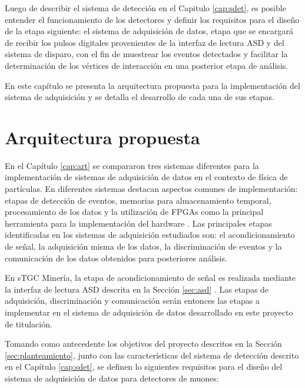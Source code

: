 Luego de describir el sistema de detección en el Capitulo \ref{cap:sdet}, es posible entender el funcionamiento de los detectores y definir los requisitos para el diseño de la etapa siguiente: el sistema de adquisición de datos, etapa que se encargará de recibir los pulsos digitales provenientes de la interfaz de lectura ASD y del sistema de disparo, con el fin de muestrear los eventos detectados y facilitar la determinación de los vértices de interacción en una posterior etapa de análisis.

En este capítulo se presenta la arquitectura propuesta para la implementación del sistema de adquisición y se detalla el desarrollo de cada una de sus etapas.

\section{Arquitectura propuesta}
\label{sec:arq}

	En el Capítulo \ref{cap:art} se compararon tres sistemas diferentes para la implementación de sistemas de adquisición de datos en el contexto de física de partículas. En diferentes sistemas destacan aspectos comunes de implementación: etapas de detección de eventos, memorias para almacenamiento temporal, procesamiento de los datos y la utilización de FPGAs como la principal herramienta para la implementación del hardware . Las principales etapas identificadas en los sistemas de adquisición estudiados son: el acondicionamiento de señal, la adquisición misma de los datos, la discriminación de eventos y la comunicación de los datos obtenidos para posteriores análisis.
	
	En sTGC Minería, la etapa de acondicionamiento de señal es realizada mediante la interfaz de lectura ASD descrita en la Sección \ref{sec:asd} . Las etapas de adquisición, discriminación y comunicación serán entonces las etapas a implementar en el sistema de adquisición de datos desarrollado en este proyecto de titulación.
	
	Tomando como antecedente los objetivos del proyecto descritos en la Sección \ref{sec:planteamiento}, junto con las características del sistema de detección descrito en el Capítulo \ref{cap:sdet}, se definen lo siguientes requisitos para el diseño del sistema de adquisición de datos para detectores de muones:
	
